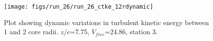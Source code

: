 \begin{figure}[H]
\centering
\texttt{[image: figs/run\_26/run\_26\_ctke\_12rdynamic]}
\caption{Plot showing dynamic variations in turbulent kinetic energy between 1 and 2 core radii. $z/c$=7.75, $V_{free}$=24.86, station 3.}
\label{fig:run_26_ctke_12rdynamic}
\end{figure}


